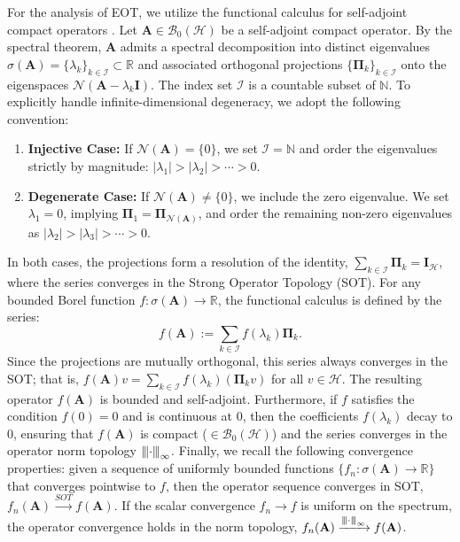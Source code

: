 \documentclass[noinfoline]{imsart}\setcounter{tocdepth}{2}
\renewcommand{\b}[1]{\mathbb{#1}}
\newcommand{\m}[1]{\mathbf{#1}}
\renewcommand{\c}[1]{\mathcal{#1}}
\newcommand{\vertiii}[1]{{\left\vert\kern-0.25ex\left\vert\kern-0.25ex\left\vert #1 
    \right\vert\kern-0.25ex\right\vert\kern-0.25ex\right\vert}} %
\newcommand{\vertii}[1]{{\vert\kern-0.25ex\vert\kern-0.25ex\vert #1 
    \vert\kern-0.25ex\vert\kern-0.25ex\vert}} %
\theoremstyle{plain}
\begin{document}
For the analysis of EOT, we utilize the functional calculus for self-adjoint compact operators \cite{hall2013quantum}. Let $\m{A} \in \c{B}_{0}(\c{H})$ be a self-adjoint compact operator. By the spectral theorem, $\m{A}$ admits a spectral decomposition into distinct eigenvalues $\sigma(\m{A}) = \{\lambda_{k}\}_{k \in \c{I}} \subset \b{R}$ and associated orthogonal projections $\{\m{\Pi}_{k}\}_{k \in \c{I}}$ onto the eigenspaces $\c{N}(\m{A} - \lambda_{k} \m{I})$. The index set $\c{I}$ is a countable subset of $\b{N}$. To explicitly handle infinite-dimensional degeneracy, we adopt the following convention:
\begin{enumerate}[leftmargin = *]
\item \textbf{Injective Case:} If $\c{N}(\m{A}) = \{0\}$, we set $\c{I} = \b{N}$ and order the eigenvalues strictly by magnitude: $|\lambda_{1}| > |\lambda_{2}| > \cdots > 0$.
\item \textbf{Degenerate Case:} If $\c{N}(\m{A}) \neq \{0\}$, we include the zero eigenvalue. We set $\lambda_{1} = 0$, implying $\m{\Pi}_{1} = \m{\Pi}_{\c{N}(\m{A})}$, and order the remaining non-zero eigenvalues as $|\lambda_{2}| > |\lambda_{3}| > \cdots > 0$.
\end{enumerate}
In both cases, the projections form a resolution of the identity, $\sum_{k \in \c{I}} \m{\Pi}_{k} = \m{I}_{\c{H}}$, where the series converges in the Strong Operator Topology (SOT).
For any bounded Borel function $f: \sigma(\m{A}) \to \b{R}$, the functional calculus is defined by the series:
\begin{equation*}
    f(\m{A}) 
    := \sum_{k \in \c{I}} f(\lambda_{k}) \m{\Pi}_{k}.
\end{equation*}
Since the projections are mutually orthogonal, this series always converges in the SOT; that is, $f(\m{A})v = \sum_{k \in \c{I}} f(\lambda_{k}) (\m{\Pi}_{k} v)$ for all $v \in \c{H}$. The resulting operator $f(\m{A})$ is bounded and self-adjoint. Furthermore, if $f$ satisfies the condition $f(0)=0$ and is continuous at $0$, then the coefficients $f(\lambda_k)$ decay to $0$, ensuring that $f(\m{A})$ is compact ($\in \c{B}_{0}(\c{H})$) and the series converges in the operator norm topology $\vertiii{\cdot}_{\infty}$. 
Finally, we recall the following convergence properties: given a sequence of uniformly bounded functions $\{f_{n}: \sigma(\m{A}) \to \b{R}\}$ that converges pointwise to $f$, then the operator sequence converges in SOT, $f_{n}(\m{A}) \xrightarrow{SOT} f(\m{A})$. If the scalar convergence $f_{n} \to f$ is uniform on the spectrum, the operator convergence holds in the norm topology, $f_{n}(\m{A}) \xrightarrow{\vertii{\cdot}_{\infty}} f(\m{A})$.
\end{document}
